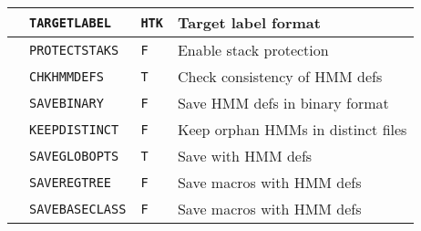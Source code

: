 \begin{center}
\begin{supertabular}{|p{1.8cm}|l|l|p{6.6cm}|}
  & \texttt{TARGETLABEL} & \texttt{HTK} & Target label format \\ \hline





























 & \texttt{PROTECTSTAKS} & \texttt{F} & Enable stack protection \\ \hline










  & \texttt{CHKHMMDEFS} & \texttt{T} & Check consistency of HMM defs \\ 


  & \texttt{SAVEBINARY} & \texttt{F} & Save HMM defs in binary format \\ 


  & \texttt{KEEPDISTINCT} & \texttt{F} & Keep orphan HMMs in distinct files \\ 


  & \texttt{SAVEGLOBOPTS} & \texttt{T} & Save  with HMM defs \\ 


  & \texttt{SAVEREGTREE} & \texttt{F} & Save  macros with HMM defs \\ 




    & \texttt{SAVEBASECLASS} & \texttt{F} & Save  macros with HMM defs \\ 



\end{supertabular}
\end{center}
